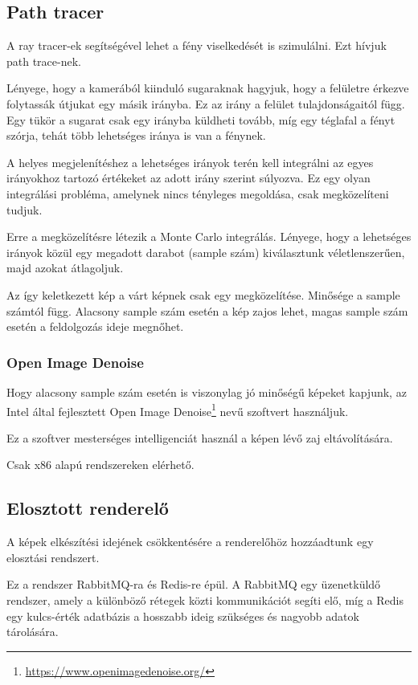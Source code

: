 \subsection{Path tracer}
A ray tracer-ek segítségével lehet a fény viselkedését is szimulálni. Ezt hívjuk path trace-nek.

Lényege, hogy a kamerából kiinduló sugaraknak hagyjuk, hogy a felületre érkezve folytassák útjukat egy másik irányba. Ez az irány a felület tulajdonságaitól függ. Egy tükör a sugarat csak egy irányba küldheti tovább, míg egy téglafal a fényt szórja, tehát több lehetséges iránya is van a fénynek.

A helyes megjelenítéshez a lehetséges irányok terén kell integrálni az egyes irányokhoz tartozó értékeket az adott irány szerint súlyozva. Ez egy olyan integrálási probléma, amelynek nincs tényleges megoldása, csak megközelíteni tudjuk.

Erre a megközelítésre létezik a Monte Carlo integrálás. Lényege, hogy a lehetséges irányok közül egy megadott darabot (sample szám) kiválasztunk véletlenszerűen, majd azokat átlagoljuk.

Az így keletkezett kép a várt képnek csak egy megközelítése. Minősége a sample számtól függ. Alacsony sample szám esetén a kép zajos lehet, magas sample szám esetén a feldolgozás ideje megnőhet.

\subsubsection{Open Image Denoise}
Hogy alacsony sample szám esetén is viszonylag jó minőségű képeket kapjunk, az Intel által fejlesztett Open Image Denoise\footnote{\url{https://www.openimagedenoise.org/}} nevű szoftvert használjuk.

Ez a szoftver mesterséges intelligenciát használ a képen lévő zaj eltávolítására.

Csak x86 alapú rendszereken elérhető.


\subsection{Elosztott renderelő}

A képek elkészítési idejének csökkentésére a renderelőhöz hozzáadtunk egy elosztási rendszert.

Ez a rendszer RabbitMQ-ra és Redis-re épül. A RabbitMQ egy üzenetküldő rendszer, amely a különböző rétegek közti kommunikációt segíti elő, míg a Redis egy kulcs-érték adatbázis a hosszabb ideig szükséges és nagyobb adatok tárolására.


